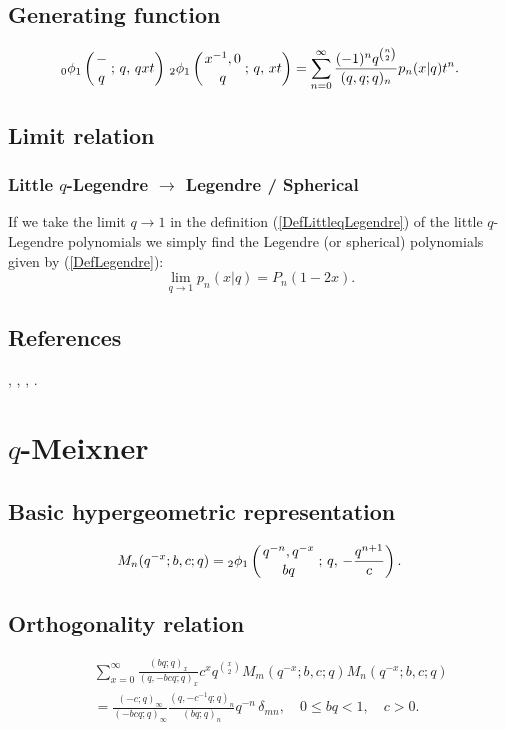 \documentclass[envcountchap,graybox]{svmono}
\newcommand{\qhyp}[5]{\mbox{}_{#1}{\phi}_{#2}
\left(\genfrac{}{}{0pt}{}{#3}{#4}\,;\,q,\,#5\right)}
\newcommand{\qhyp}[5]{\,\mbox{}_{#1}\phi_{#2}\!\left(
  \genfrac{}{}{0pt}{}{#3}{#4};#5\right)}
\begin{document}
\subsection*{Generating function}
\begin{equation}
\label{GenLittleqLegendre}
\qhyp{0}{1}{-}{q}{qxt}\,\qhyp{2}{1}{x^{-1},0}{q}{xt}=\sum_{n=0}^{\infty}
\frac{(-1)^nq^{\binom{n}{2}}}{(q,q;q)_n}p_n(x|q)t^n.
\end{equation}

\subsection*{Limit relation}

\subsubsection*{Little $q$-Legendre $\rightarrow$ Legendre / Spherical}
If we take the limit $q\rightarrow 1$ in the definition
(\ref{DefLittleqLegendre}) of the little $q$-Legendre polynomials we simply
find the Legendre (or spherical) polynomials given by (\ref{DefLegendre}):
\begin{equation}
\lim_{q\rightarrow 1}p_n(x|q)=P_n(1-2x).
\end{equation}

\subsection*{References}
\cite{Koorn90II}, \cite{Koorn91}, \cite{Rahman89}, \cite{VanAsscheKoorn}.


\section{$q$-Meixner}
\par\setcounter{equation}{0}

\subsection*{Basic hypergeometric representation}
\begin{equation}
\label{DefqMeixner}
M_n(q^{-x};b,c;q)=\qhyp{2}{1}{q^{-n},q^{-x}}{bq}{-\frac{q^{n+1}}{c}}.
\end{equation}

\newpage

\subsection*{Orthogonality relation}
\begin{eqnarray}
\label{OrtqMeixner}
& &\sum_{x=0}^{\infty}\frac{(bq;q)_x}{(q,-bcq;q)_x}c^xq^{\binom{x}{2}}M_m(q^{-x};b,c;q)M_n(q^{-x};b,c;q)\nonumber\\
& &{}=\frac{(-c;q)_{\infty}}{(-bcq;q)_{\infty}}\frac{(q,-c^{-1}q;q)_n}{(bq;q)_n}q^{-n}\,\delta_{mn},
\quad 0\leq bq<1,\quad c>0.
\end{eqnarray}
\end{document}
